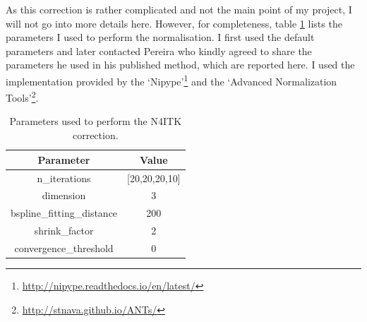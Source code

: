 \documentclass[12pt,a4paper,twoside,openright]{report}
\begin{document}
As this correction is rather complicated and not the main point of my project, I will not go into more details here. However, for completeness, table \ref{table:n4_params} lists the parameters I used to perform the normalisation. I first used the default parameters and later contacted Pereira who kindly agreed to share the parameters he used in his published method, which are reported here. I used the implementation provided by the `Nipype'\footnote{\url{http://nipype.readthedocs.io/en/latest/}} and the `Advanced Normalization Tools'\footnote{\url{http://stnava.github.io/ANTs/}}.

\begin{table}[h]
\centering	
\begin{tabular}{ c c } 
\textbf{Parameter} & \textbf{Value} \\
 \hline
 n\_iterations & [20,20,20,10] \\ 
 dimension & 3 \\
 bspline\_fitting\_distance & 200 \\
 shrink\_factor & 2\\
 convergence\_threshold & 0
\end{tabular}
\caption{Parameters used to perform the N4ITK correction.}
\label{table:n4_params}
\end{table}
\end{document}
